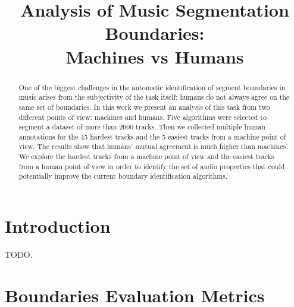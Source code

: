 \documentclass{article}
\title{Analysis of Music Segmentation Boundaries:\\ Machines vs Humans}
\begin{document}
%
\maketitle
%
\begin{abstract}
  One of the biggest challenges in the automatic identification of segment boundaries in music arises from the subjectivity of the task itself: humans do not always agree on the same set of boundaries.
  In this work we present an analysis of this task from two different points of view: machines and humans.
  Five algorithms were selected to segment a dataset of more than 2000 tracks.
  Then we collected multiple human annotations for the 45 hardest tracks and the 5 easiest tracks from a machine point of view.
  The results show that humans' mutual agreement is much higher than machines'.
  We explore the hardest tracks from a machine point of view and the easiest tracks from a human point of view in order to identify the set of audio properties that could potentially improve the current boundary identification algorithms.
  
\end{abstract}
%
\section{Introduction}\label{sec:introduction}

TODO.




\section{Boundaries Evaluation Metrics}\label{sec:evalmetrics}
\end{document}
